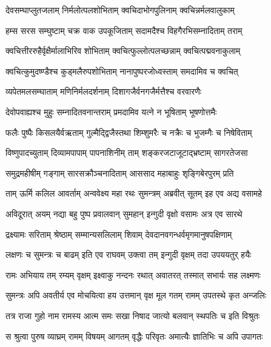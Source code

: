 \twolineshloka
{देवसम्घाप्लुतजलाम् निर्मलोत्पलशोभिताम्}
{क्वचिदाभोगपुलिनाम् क्वचिन्नर्मलवालुकाम्} %

\twolineshloka
{हम्स सरस सम्घुष्टाम् चक्र वाक उपकूजिताम्}
{सदामदैश्च विहगैरभिसम्नादिताम् तराम्} %

\twolineshloka
{क्वचित्तीररुहैर्वृक्षैर्मालाभिरिव शोभिताम्}
{क्वचित्फुल्लोत्पलच्छन्नाम् क्वचित्पद्मवनाकुलाम्} %

\twolineshloka
{क्वचित्कुमुदष्ण्डैश्च कुड्मलैरुपशोभिताम्}
{नानापुष्परजोध्वस्ताम् समदामिव च क्वचित्} %

\twolineshloka
{व्यपेतमलसम्घाताम् मणिनिर्मलदर्शनाम्}
{दिशागजैर्वनगजैर्मत्तैश्च वरवारणैः} %

\twolineshloka
{देवोपवाह्यश्च मुहुः सम्नादितवनान्तराम्}
{प्रमदामिव यत्ने न भूषिताम् भूषणोत्तमैः} %

\twolineshloka
{फलैः पुष्पैः किसलयैर्वऋताम् गुल्मैद्द्विजैस्तथा}
{शिम्शुमरैः च नक्रैः च भुजम्गैः च निषेविताम्} %

\twolineshloka
{विष्णुपादच्युताम् दिव्यामपापाम् पापनाशिनीम्}
{ताम् शङ्करजटाजूटाद्भ्रष्टाम् सागरतेजसा} %

\twolineshloka
{समुद्रमहीषीम् गङ्गाम् सारसक्रौञ्चनादिताम्}
{आससाद महाबाहुः शृङ्गिबेरपुरम् प्रति} %

\twolineshloka
{ताम् ऊर्मि कलिल आवर्ताम् अन्ववेक्ष्य महा रथः}
{सुमन्त्रम् अब्रवीत् सूतम् इह एव अद्य वसामहे} %

\twolineshloka
{अविदूरात् अयम् नद्या बहु पुष्प प्रवालवान्}
{सुमहान् इन्गुदी वृक्षो वसामः अत्र एव सारथे} %

\twolineshloka
{द्रक्ष्यामः सरिताम् श्रेष्ठाम् सम्मान्यसलिलाम् शिवाम्}
{देवदानवगन्धर्वमृगमानुषपक्षिणाम्} %

\twolineshloka
{लक्षणः च सुमन्त्रः च बाढम् इति एव राघवम्}
{उक्त्वा तम् इन्गुदी वृक्षम् तदा उपययतुर् हयैः} %

\twolineshloka
{रामः अभियाय तम् रम्यम् वृक्षम् इक्ष्वाकु नन्दनः}
{रथात् अवातरत् तस्मात् सभार्यः सह लक्ष्मणः} %

\twolineshloka
{सुमन्त्रः अपि अवतीर्य एव मोचयित्वा हय उत्तमान्}
{वृक्ष मूल गतम् रामम् उपतस्थे कृत अन्जलिः} %

\twolineshloka
{तत्र राजा गुहो नाम रामस्य आत्म समः सखा}
{निषाद जात्यो बलवान् स्थपतिः च इति विश्रुतः} %

\twolineshloka
{स श्रुत्वा पुरुष व्याघ्रम् रामम् विषयम् आगतम्}
{वृद्धैः परिवृतः अमात्यैः ज्ञातिभिः च अपि उपागतः} %


